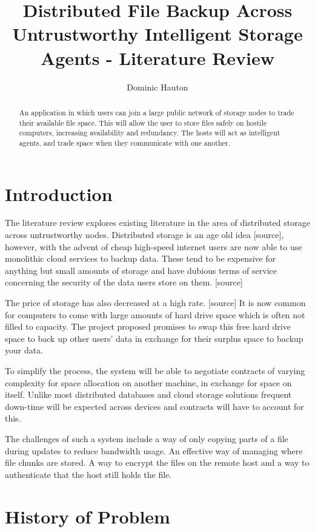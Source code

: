 \documentclass[a4paper,11pt]{article}
\title{Distributed File Backup Across Untrustworthy Intelligent Storage Agents - Literature Review}
\author{Dominic Hauton}
\begin{document}
\maketitle

\begin{abstract}
An application in which users can join a large public network of storage nodes to trade their available file space. This will allow the user to store files safely on hostile computers, increasing availability and redundancy. The hosts will act as intelligent agents, and trade space when they communicate with one another.
\end{abstract}

\section{Introduction}
The literature review explores existing literature in the area of distributed storage across untrustworthy nodes. Distributed storage is an age old idea [source], however, with the advent of cheap high-speed internet users are now able to use monolithic cloud services to backup data. These tend to be expensive for anything but small amounts of storage and have dubious terms of service concerning the security of the data users store on them. [source]

The price of storage has also decreased at a high rate. [source] It is now common for computers to come with large amounts of hard drive space which is often not filled to capacity. The project proposed promises to swap this free hard drive space to back up other users’ data in exchange for their surplus space to backup your data.

To simplify the process, the system will be able to negotiate contracts of varying complexity for space allocation on another machine, in exchange for space on itself. Unlike most distributed databases and cloud storage solutions frequent down-time will be expected across devices and contracts will have to account for this.

The challenges of such a system include a way of only copying parts of a file during updates to reduce bandwidth usage. An effective way of managing where file chunks are stored. A way to encrypt the files on the remote host and a way to authenticate that the host still holds the file.

\section{History of Problem}
\end{document}
